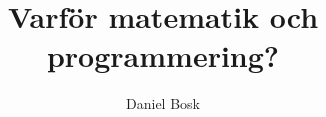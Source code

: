 \documentclass{article}
\begin{document}
\title{%
  Varför matematik och programmering?
}
\author{Daniel Bosk}

\maketitle

\begin{abstract}
  
\end{abstract}



\printbibliography
\end{document}
